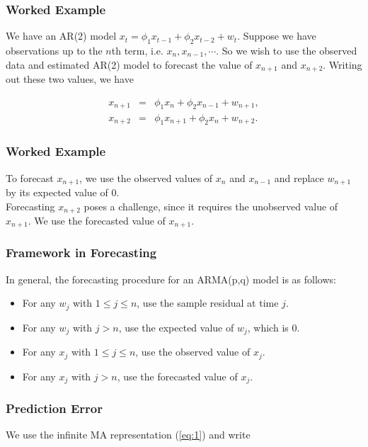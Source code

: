 \documentclass[%
xcolor=pdftex]{beamer}
\begin{document}
\begin{frame}
\frametitle{Worked Example}

We have an AR(2) model $x_t = \phi_1 x_{t-1} + \phi_2 x_{t-2} + w_t$. Suppose we have observations up to the $n$th term, i.e. $x_n, x_{n-1}, \cdots$. So we wish to use the observed data and estimated AR(2) model to forecast the value of $x_{n+1}$ and $x_{n+2}$. Writing out these two values, we have

\begin{eqnarray*}
x_{n+1} &=& \phi_1 x_{n} + \phi_2 x_{n-1} + w_{n+1}, \\
x_{n+2} &=& \phi_1 x_{n+1} + \phi_2 x_{n} + w_{n+2}.
\end{eqnarray*}

\end{frame}

\begin{frame}
\frametitle{Worked Example}

To forecast $x_{n+1}$, we use the observed values of $x_{n}$ and $x_{n-1}$ and replace $w_{n+1}$ by its expected value of 0.\\
\vspace{5mm}
Forecasting $x_{n+2}$ poses a challenge, since it requires the unobserved value of $x_{n+1}$. We use the forecasted value of $x_{n+1}$.

\end{frame}

\begin{frame}
\frametitle{Framework in Forecasting}

In general, the forecasting procedure for an ARMA(p,q) model is as follows:

\begin{itemize}
\item For any $w_j$ with $1 \leq j \leq n$, use the sample residual at time $j$.
\item For any $w_j$ with $j>n$, use the expected value of $w_j$, which is 0.
\item For any $x_j$ with $1 \leq j \leq n$, use the observed value of $x_j$.
\item For any $x_j$ with $j>n$, use the forecasted value of $x_j$.
\end{itemize}

\end{frame}

\begin{frame}
\frametitle{Prediction Error}

We use the infinite MA representation (\ref{eq:1}) and write

\vspace{50mm}
\end{frame}
\end{document}
